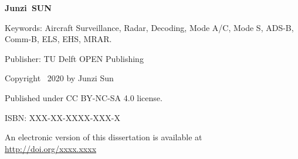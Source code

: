 \begin{titlepage}

\thispagestyle{empty}

\vspace*{2\bigskipamount}

{\makeatletter
\titlestyle\bfseries\Huge\@title
\makeatother}

{\makeatletter
\ifx\@subtitle\undefined\else
    \bigskip
    \titlefont\titleshape\LARGE\@subtitle
\fi
\makeatother}


\vspace*{8\bigskipamount}


\makeatletter
{\huge\titlefont\bfseries{Junzi}\ {SUN}}
\makeatother

\vspace*{8\bigskipamount}

\makeatletter
{\large{}}
\makeatother


\clearpage


\thispagestyle{empty}

\vspace*{25\bigskipamount}



Keywords: Aircraft Surveillance, Radar, Decoding, Mode A/C, Mode S, ADS-B, Comm-B, ELS, EHS, MRAR.

\medskip

Publisher: TU Delft OPEN Publishing

\vspace{4\bigskipamount}


Copyright \textcopyright\ 2020 by Junzi Sun

\medskip

Published under CC BY-NC-SA 4.0 license.

\medskip
ISBN: XXX-XX-XXXX-XXX-X

\medskip
\medskip
An electronic version of this dissertation is available at \\
\url{http://doi.org/xxxx.xxxx}

\end{titlepage}